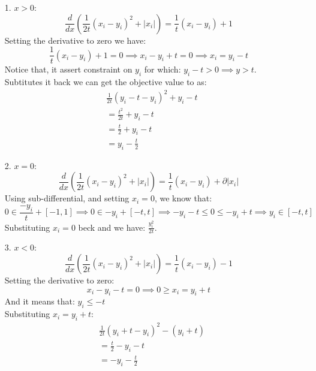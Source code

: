 \documentclass[]{article}
\begin{document}
    \begin{enumerate}
        \item[1.] $x > 0$:\\
            $$
                \frac{d}{dx}\left(
                    \frac{1}{2t}(x_i - y_i)^2 + |x_i|
                \right)
                =
                \frac{1}{t}(x_i - y_i) + 1
            $$
            Setting the derivative to zero we have: 
            $$
                \frac{1}{t}(x_i - y_i) + 1 = 0 \implies x_i - y_i + t = 0 \implies x_i = y_i - t
            $$
            Notice that, it assert constraint on $y_i$ for which: $y_i - t > 0 \implies y > t$.
            \\
            Subtitutes it back we can get the objective value to as: 
            \begin{align*}
                & \frac{1}{2t}(y_i - t - y_i)^2 + y_i - t \\ 
                &= \frac{t^2}{2t} + y_i - t\\
                &= \frac{t}{2} + y_i - t\\
                &= y_i - \frac{t}{2}
            \end{align*}
        \item[2. ] $x = 0$: \\
            $$
                \frac{d}{dx}\left(
                    \frac{1}{2t}(x_i - y_i)^2 + |x_i|
                \right)
                =
                \frac{1}{t}(x_i - y_i) + \partial |x_i|
            $$
            Using sub-differential, and setting $x _i = 0$, we know that: 
            $$
                0 \in \frac{-y_i}{t} + [-1, 1] \implies 0 \in -y_i + [-t, t] \implies -y_i - t \le 0 \le -y_i + t \implies y_i \in [-t, t]
            $$
            Substituting $x_i = 0$ beck and we have: $\frac{y_i^2}{2t}$. 
        \item [3.] $x < 0$: 
            $$
                \frac{d}{dx}\left(
                    \frac{1}{2t}(x_i - y_i)^2 + |x_i|
                \right)
                =
                \frac{1}{t}(x_i - y_i) - 1
            $$
            Setting the derivative to zero: 
            $$
                x_i - y_i - t = 0 \implies 0 \ge x_i = y_i + t
            $$
            And it means that: $y_i \le -t$
            \\
            Substituting $x_i = y_i + t$: 
            \begin{align*}
                & \frac{1}{2t}(y_i + t - y_i)^2 - (y_i + t) \\
                &= \frac{t}{2} - y_i - t\\
                &= -y_i - \frac{t}{2}
            \end{align*}

    \end{enumerate}
\end{document}
